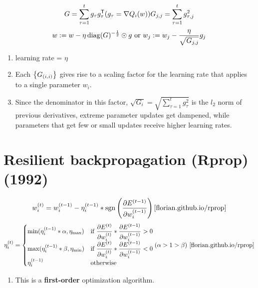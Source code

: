 \[
    {\displaystyle G=\sum _{\tau =1}^{t}g_{\tau }g_{\tau }^{\mathsf {T}}}
    \hfill
    ({\displaystyle g_{\tau }=\nabla Q_{i}(w)})
    \hfill
    {\displaystyle G_{j,j}=\sum _{\tau =1}^{t}g_{\tau ,j}^{2}}
\]
\[
    {\displaystyle w:=w-\eta \,\mathrm {diag} (G)^{-{\frac {1}{2}}}\odot g} 
    \hfill \text{ or } \hfill
    {\displaystyle w_{j}:=w_{j}-{\frac {\eta }{\sqrt {G_{j,j}}}}g_{j}}
\]

\begin{enumerate}
    \item learning rate = $\eta$

    \item Each $\left\{G_{(i,i)}\right\}$ gives rise to a scaling factor for the learning rate that applies to a single parameter $w_i$.

    \item Since the denominator in this factor, ${\displaystyle {\sqrt {G_{i}}}={\sqrt {\sum _{\tau =1}^{t}g_{\tau }^{2}}}}$ is the $l_2$ norm of previous derivatives, extreme parameter updates get dampened, while parameters that get few or small updates receive higher learning rates.    
\end{enumerate}


\section{Resilient backpropagation (Rprop) (1992) \cite{wiki-Rprop,pytorch-Rprop,florian.github.io/rprop}}\label{Resilient backpropagation (Rprop)}

\[
    \displaystyle w_i^{(t)} = w_i^{(t - 1)} - \eta_i^{(t - 1)} * \operatorname{sgn}\left(\dfrac{\partial E^{(t -
    1)}}{\partial w_i^{(t - 1)}}\right)
    \hfill
    \text{\cite{florian.github.io/rprop}}
\]
\[
    \displaystyle \eta_i^{(t)} = \begin{cases}
    \min(\eta_i^{(t - 1)} * \alpha, \eta_{\max}) & \text{if } \displaystyle\dfrac{\partial E^{(t)}}{\partial w_i^{(t)}} * \displaystyle\dfrac{\partial E^{(t - 1)}}{\partial w_i^{(t - 1)}} > 0 \\
    \max(\eta_i^{(t - 1)} * \beta, \eta_{\min}) & \text{if } \displaystyle\dfrac{\partial E^{(t)}}{\partial w_i^{(t)}} * \displaystyle\dfrac{\partial E^{(t - 1)}}{\partial w_i^{(t - 1)}} < 0 \\
    \eta_i^{(t - 1)} & \text{otherwise}
    \end{cases}
    \hfill
    (\alpha > 1 > \beta) \text{ \cite{florian.github.io/rprop}}
\]


\begin{enumerate}
    \item This is a \textbf{first-order} optimization algorithm.
\end{enumerate}


